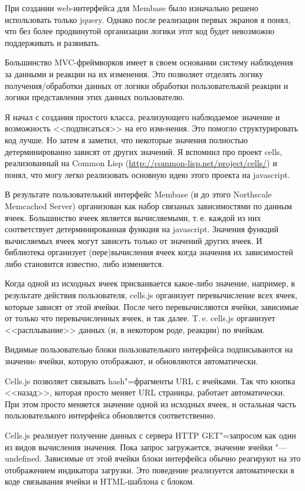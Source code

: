 \documentclass[10pt, a5paper]{article}
\begin{document}
При создании web-интерфейса для Membase было изначально решено
использовать только jquery. Однако после реализации первых экранов я
понял, что без более продвинутой организации логики этот код будет
невозможно поддерживать и развивать.

Большинство MVC-фреймворков имеет в своем основании систему наблюдения
за данными и реакции на их изменения. Это позволяет отделять логику
получения/обработки данных от логики обработки пользователькой реакции
и логики представления этих данных пользователю.

Я начал с создания простого класса, реализующего наблюдаемое значение и
возможность <<подписаться>> на его измeнения. Это помогло
структурировать код лучше. Но затем я заметил, что некоторые значения
полностью детерминированно зависят от других значений. Я вспомнил про
проект cells, реализованный на Common Lisp
(\url{http://common-lisp.net/project/cells/}) и понял, что могу легко
реализовать основную идею этого проекта на javascript.

В результате пользователький интерфейс Membase (и до этого Northscale
Memcached Server) организован как набор связаных зависимостями по
данным ячеек. Большинство ячеек является вычисляемыми, т.\,е. каждой из
них соответствует детерминированная функция на javascript. Значения
функций вычисляемых ячеек могут зависеть только от значений других
ячеек. И библиотека организует (пере)вычисления ячеек когда значения
их зависимостей либо становится известно, либо изменяется.

Когда одной из исходных ячеек присваивается какое-либо значение,
например, в результате действия пользователя, cells.js организует
перевычисление всех ячеек, которые зависят от этой ячейки. После чего
перевычисляются ячейки, зависимые от только что перевычисленных ячеек, и
так далее. T.\,e. cells.js организует <<расплывание>> данных (и, в
некотором роде, реакции) по ячейкам.

Видимые пользователью блоки пользователького интерфейса \linebreak подписываются
на значениe ячейки, которую отображают, и обновляются автоматически.

Cells.js позволяет связывать hash"=фрагменты URL с ячейками. Так что
кнопка <<назад>>, которая просто меняет URL страницы, работает
автоматически. При этом просто меняется значение одной из исходных
ячеек, и остальная часть пользователького интерфейса обновляется
соответственно.

Cells.js реализует получение данных с сервера HTTP GET"=запросом как
один из видов вычисления значения. Пока запрос загружается, значение
ячейки "--- undefined. Зависимые от этой ячейки блоки интерфейса
обычно реагируют на это отображением индикатора загрузки. Это
поведение реализуется автоматически в коде связывания ячейки и
HTML-шаблона с блоком.
\end{document}
